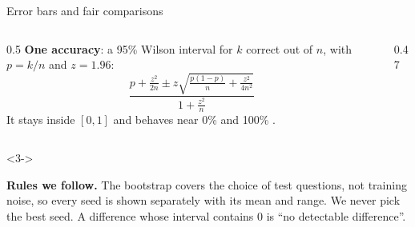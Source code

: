 \begin{frame}{Error bars and fair comparisons\hfill\est\ }
  \begin{columns}[T]
    \begin{column}{0.5\textwidth}
      \small
      \textbf{One accuracy}: a 95\% Wilson interval for $k$ correct out of
      $n$, with $p = k/n$ and $z = 1.96$:
      \[
        \frac{p + \frac{z^2}{2n} \pm z\sqrt{\frac{p(1-p)}{n} + \frac{z^2}{4n^2}}}{1 + \frac{z^2}{n}}
      \]
      It stays inside $[0,1]$ and behaves near 0\% and 100\%
      .
    \end{column}
    \begin{column}{0.47\textwidth}
      \small
    \end{column}
  \end{columns}
  \vspace{0.2cm}
  \begin{uncoverenv}<3->
  \begin{keybox}
    \footnotesize \textbf{Rules we follow.} The bootstrap covers the choice of test
    questions, not training noise, so every seed is shown separately with its
    mean and range. We never pick the best seed. A difference whose interval
    contains 0 is ``no detectable difference''.
  \end{keybox}
  \end{uncoverenv}
\end{frame}

